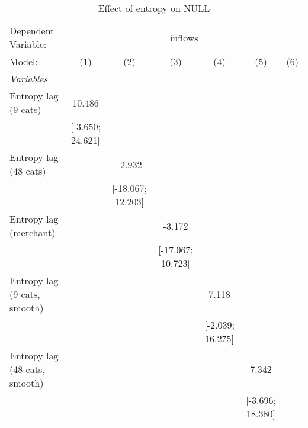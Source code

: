 
\begin{table}[htbp]
   \centering
   \tiny
   \begin{threeparttable}[b]
      \caption{\label{tab:reg_inflows_cnz} Effect of entropy on NULL}
      \begin{tabular}{lcccccc}
         \tabularnewline \midrule \midrule
         Dependent Variable: & \multicolumn{6}{c}{inflows}\\
         Model:                         & (1)                  & (2)                  & (3)                  & (4)                  & (5)                  & (6)\\  
         \midrule
         \emph{Variables}\\
         Entropy lag (9 cats)           & 10.486               &                      &                      &                      &                      &   \\   
                                        & [-3.650; 24.621]     &                      &                      &                      &                      &   \\   
         Entropy lag (48 cats)          &                      & -2.932               &                      &                      &                      &   \\   
                                        &                      & [-18.067; 12.203]    &                      &                      &                      &   \\   
         Entropy lag (merchant)         &                      &                      & -3.172               &                      &                      &   \\   
                                        &                      &                      & [-17.067; 10.723]    &                      &                      &   \\   
         Entropy lag (9 cats, smooth)   &                      &                      &                      & 7.118                &                      &   \\   
                                        &                      &                      &                      & [-2.039; 16.275]     &                      &   \\   
         Entropy lag (48 cats, smooth)  &                      &                      &                      &                      & 7.342                &   \\   
                                        &                      &                      &                      &                      & [-3.696; 18.380]     &   \\   

\end{tabular}
\end{threeparttable}
\end{table}
